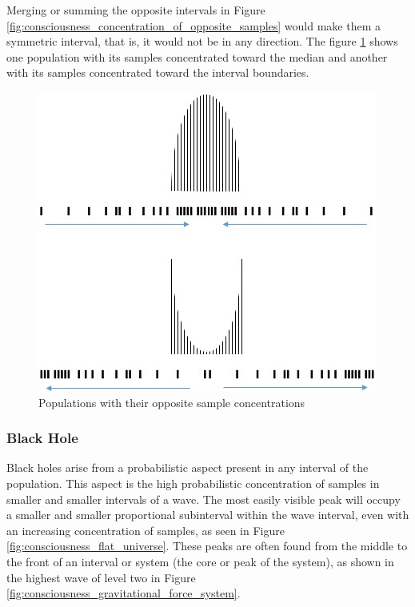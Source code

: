 Merging or summing the opposite intervals in Figure \ref{fig:consciousness_concentration_of_opposite_samples} would make them a symmetric interval, that is, it would not be in any direction.
The figure \ref{fig:consciousness_concentration_of_opposite_samples_within_range} shows one population with its samples concentrated toward the median and another with its samples concentrated toward the interval boundaries.
	\begin{figure}[H]
	\caption{Populations with their opposite sample concentrations}
	\label{fig:consciousness_concentration_of_opposite_samples_within_range}
	\centering
	\includegraphics[scale=.7]{sections/images/consciousness_concentration_of_opposite_samples_within_range.jpg}
	\end{figure}

\subsubsection{Black Hole}
Black holes arise from a probabilistic aspect present in any interval of the population. This aspect is the high probabilistic concentration of samples in smaller and smaller intervals of a wave. The most easily visible peak will occupy a smaller and smaller proportional subinterval within the wave interval, even with an increasing concentration of samples, as seen in Figure \ref{fig:consciousness_flat_universe}. These peaks are often found from the middle to the front of an interval or system (the core or peak of the system), as shown in the highest wave of level two in Figure \ref{fig:consciousness_gravitational_force_system}.

